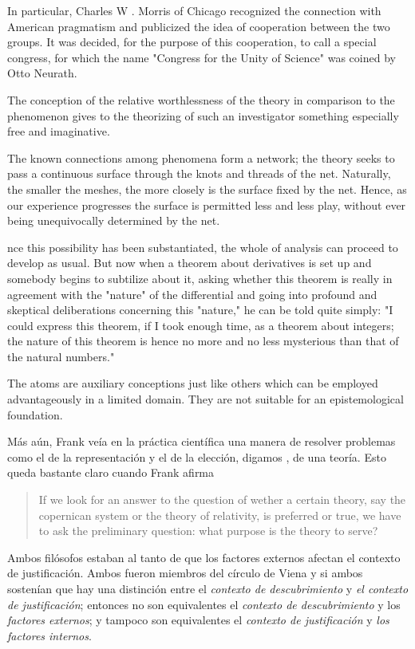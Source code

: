 In particular, Charles  W . Morris of Chicago recognized the connection  with American pragmatism and publicized the idea  of cooperation between the two groups. It was decided, for the purpose of this cooperation, to call a  special congress, for which the name "Congress for  the Unity of Science" was coined by Otto Neurath.

The conception of the relative worthlessness of the theory in  comparison to the phenomenon gives to the theorizing  of such an investigator something especially free and  imaginative.

The known connections among  phenomena form a network; the theory seeks to pass  a continuous surface through the knots and threads  of the net. Naturally, the smaller the meshes, the  more closely is the surface fixed by the net. Hence,  as our experience progresses the surface is permitted  less and less play, without ever being unequivocally  determined by the net.

nce this possibility has been substantiated,  the whole of analysis can proceed to develop as usual.  But now when a theorem about derivatives is set up  and somebody begins to subtilize about it, asking  whether this theorem is really in agreement with the  "nature" of the differential and going into profound  and skeptical deliberations concerning this "nature,"  he can be told quite simply: "I could express this  theorem, if I took enough time, as a theorem about  integers; the nature of this theorem is hence no more  and no less mysterious than that of the natural  numbers."

The  atoms are auxiliary conceptions just like others which  can be employed advantageously in a limited domain.  They are not suitable for an epistemological foundation.

Más aún, Frank veía en la práctica científica una manera de resolver problemas como el de la representación y el de la elección, digamos , de una teoría.
Esto queda bastante claro cuando Frank afirma

\begin{quote}
	If we look for an answer to the question of wether a certain theory, say the copernican system or the theory of relativity, is preferred or true, we have to ask the preliminary question: what purpose is the theory to serve? \parencite[p. 15]{Frank1954}
\end{quote}

Ambos filósofos estaban al tanto de que los factores externos afectan el contexto de justificación.
Ambos fueron miembros del círculo de Viena y si ambos sostenían que hay una distinción entre el \emph{contexto de descubrimiento} y \emph{el contexto de justificación}; entonces no son equivalentes el \emph{contexto de descubrimiento} y los \emph{factores externos}; y  tampoco son equivalentes el \emph{contexto de justificación} y \emph{los factores internos}.

